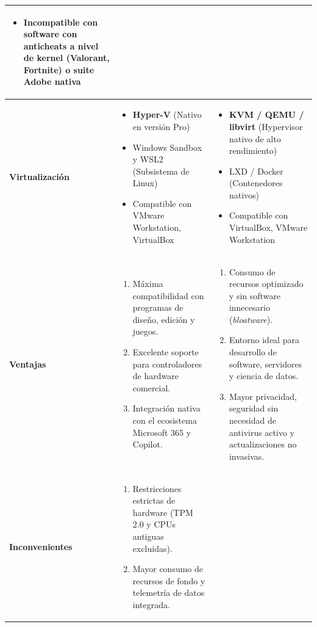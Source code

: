 \documentclass[11.5pt]{article}
\begin{document}
\begin{table}[H]
\begin{tabularx}{\textwidth}{|l|X|X|}
\begin{itemize}[leftmargin=*,nosep]
				\item \textbf{Incompatible} con software con anticheats a nivel de kernel (Valorant, Fortnite) o suite Adobe nativa
			\end{itemize} \\
			\hline
			\textbf{Virtualización} & 
			\begin{itemize}[leftmargin=*,nosep]
				\item \textbf{Hyper-V} (Nativo en versión Pro)
				\item Windows Sandbox y WSL2 (Subsistema de Linux)
				\item Compatible con VMware Workstation, VirtualBox
			\end{itemize} & 
			\begin{itemize}[leftmargin=*,nosep]
				\item \textbf{KVM / QEMU / libvirt} (Hypervisor nativo de alto rendimiento)
				\item LXD / Docker (Contenedores nativos)
				\item Compatible con VirtualBox, VMware Workstation
			\end{itemize} \\
			\hline
			\textbf{Ventajas} & 
			\begin{enumerate}[leftmargin=*,nosep]
				\item Máxima compatibilidad con programas de diseño, edición y juegos.
				\item Excelente soporte para controladores de hardware comercial.
				\item Integración nativa con el ecosistema Microsoft 365 y Copilot.
			\end{enumerate} & 
			\begin{enumerate}[leftmargin=*,nosep]
				\item Consumo de recursos optimizado y sin software innecesario (\textit{bloatware}).
				\item Entorno ideal para desarrollo de software, servidores y ciencia de datos.
				\item Mayor privacidad, seguridad sin necesidad de antivirus activo y actualizaciones no invasivas.
			\end{enumerate} \\
			\hline
			\textbf{Inconvenientes} & 
			\begin{enumerate}[leftmargin=*,nosep]
				\item Restricciones estrictas de hardware (TPM 2.0 y CPUs antiguas excluidas).
				\item Mayor consumo de recursos de fondo y telemetría de datos integrada.

\end{enumerate}
\end{tabularx}
\end{table}
\end{document}
